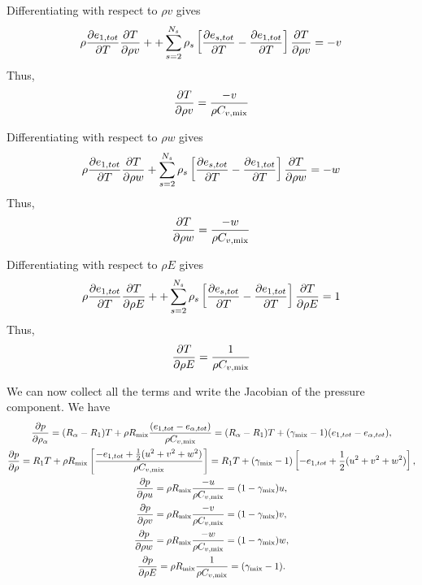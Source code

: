 Differentiating with respect to $\rho v$ gives
%
\begin{equation*}
\rho \frac{\partial e_{1,tot}}{\partial T} \frac{\partial T}{\partial \rho v} + + \sum_{s=2}^{N_s} \rho_s \left[ \frac{\partial e_{s,tot}}{\partial T} - \frac{\partial e_{1,tot}}{\partial T} \right] \frac{\partial T}{\partial \rho v} = -v
\end{equation*}
%
Thus,
%
\begin{equation*}
\frac{\partial T}{\partial \rho v} = \frac{-v}{\rho C_{v,\text{mix}}}
\end{equation*}
%

Differentiating with respect to $\rho w$ gives
%
\begin{equation*}
\rho \frac{\partial e_{1,tot}}{\partial T} \frac{\partial T}{\partial \rho w} + \sum_{s=2}^{N_s} \rho_s \left[ \frac{\partial e_{s,tot}}{\partial T} - \frac{\partial e_{1,tot}}{\partial T} \right] \frac{\partial T}{\partial \rho w} = -w
\end{equation*}
%
Thus,
%
\begin{equation*}
\frac{\partial T}{\partial \rho w} = \frac{-w}{\rho C_{v,\text{mix}}}
\end{equation*}
%

Differentiating with respect to $\rho E$ gives
%
\begin{equation*}
\rho \frac{\partial e_{1,tot}}{\partial T} \frac{\partial T}{\partial \rho E} + + \sum_{s=2}^{N_s} \rho_s \left[ \frac{\partial e_{s,tot}}{\partial T} - \frac{\partial e_{1,tot}}{\partial T} \right] \frac{\partial T}{\partial \rho E} = 1
\end{equation*}
%
Thus,
%
\begin{equation*}
\frac{\partial T}{\partial \rho E} = \frac{1}{\rho C_{v,\text{mix}}}
\end{equation*}
%

We can now collect all the terms and write the Jacobian of the
pressure component.  We have
%
\begin{gather*}
\frac{\partial p}{\partial \rho_{\alpha}} = (R_{\alpha} - R_1) T + \rho R_{\text{mix}} \frac{(e_{1,tot} - e_{\alpha, tot})}{\rho C_{v,\text{mix}}} = (R_{\alpha} - R_1) T + (\gamma_{\text{mix}} - 1) (e_{1,tot} - e_{\alpha, tot}), \\
\frac{\partial p}{\partial \rho} = R_1 T + \rho R_{\text{mix}} \left[ \frac{-e_{1,tot} + \frac{1}{2} (u^2 + v^2 + w^2)}{\rho C_{v,\text{mix}}} \right] = R_1 T + (\gamma_{\text{mix}} - 1) \left[ -e_{1,tot} + \frac{1}{2} (u^2 + v^2 + w^2) \right], \\
\frac{\partial p}{\partial \rho u} = \rho R_{\text{mix}} \frac{-u}{\rho C_{v,\text{mix}}} = (1 - \gamma_{\text{mix}}) u, \\
\frac{\partial p}{\partial \rho v} = \rho R_{\text{mix}} \frac{-v}{\rho C_{v,\text{mix}}} = (1 - \gamma_{\text{mix}}) v, \\
\frac{\partial p}{\partial \rho w} = \rho R_{\text{mix}} \frac{-w}{\rho C_{v,\text{mix}}} = (1 - \gamma_{\text{mix}}) w, \\
\frac{\partial p}{\partial \rho E} = \rho R_{\text{mix}} \frac{1}{\rho C_{v,\text{mix}}} = (\gamma_{\text{mix}} - 1). \\
\end{gather*}
%

